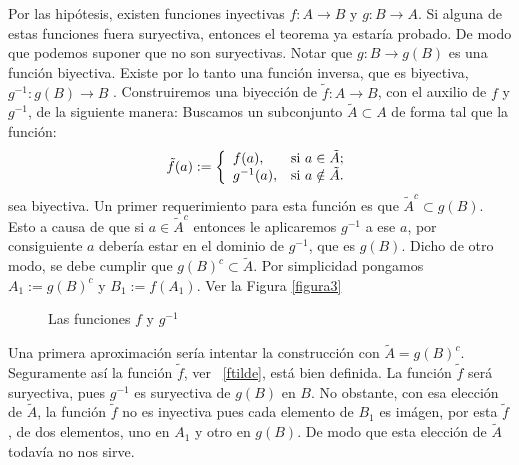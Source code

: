 \begin{demo} 
Por las hipótesis, existen funciones inyectivas
$f:A\longrightarrow B$ y $g:B\longrightarrow A$. Si alguna de
estas funciones fuera suryectiva, entonces el teorema ya
estaría probado. De modo que podemos suponer que no son
suryectivas. Notar que $g:B\longrightarrow g(B)$ es una función
biyectiva.  Existe por lo tanto una
función inversa, que es biyectiva, $g^{-1}:g(B)\longrightarrow
B$ . Construiremos una biyección de $\tilde{f}:A\longrightarrow
B$, con el auxilio de $f$ y $g^{-1}$, de la siguiente manera:
Buscamos un subconjunto $\tilde{A}\subset A$ de forma tal que la
función:
\begin{equation}\label{ftilde}
\tilde{f}(a):=\left\{%
\begin{array}{ll}
    f(a), & \hbox{si $a\in \tilde{A}$;} \\
    g^{-1}(a), & \hbox{si $a\notin\tilde{A}$.} \\
\end{array}%
\right.
\end{equation}
sea biyectiva. Un primer requerimiento para esta función es que
$\tilde{A}^c\subset g(B)$. Esto a causa de que si
$a\in\tilde{A}^c$ entonces le aplicaremos $g^{-1}$ a ese $a$, por
consiguiente $a$ debería estar en el dominio de $g^{-1}$, que
es $g(B)$. Dicho de otro modo, se debe cumplir que
$g(B)^c\subset\tilde{A}$. Por simplicidad pongamos $A_1:=g(B)^c$ y
$B_1:=f(A_1)$. Ver la Figura \vref{figura3}


\begin{figure}[h]


\begin{center}
\end{center}

 \caption{Las funciones $f$ y $g^{-1}$}\label{figura3}
\end{figure}

Una primera aproximación sería intentar la construcción
con $\tilde{A}=g(B)^c$. Seguramente así la función
$\tilde{f}$, ver ~\eqref{ftilde}, está bien definida. La
función $\tilde{f}$ será suryectiva, pues $g^{-1}$ es
suryectiva de $g(B)$ en $B$. No obstante, con esa elección de
$\tilde{A}$, la función $\tilde{f}$ no es inyectiva pues cada
elemento de $B_1$ es imágen, por esta $\tilde{f}$, de dos
elementos, uno en $A_1$ y otro en $g(B)$. De modo que esta
elección de $\tilde{A}$ todavía no nos sirve.


\end{demo}
